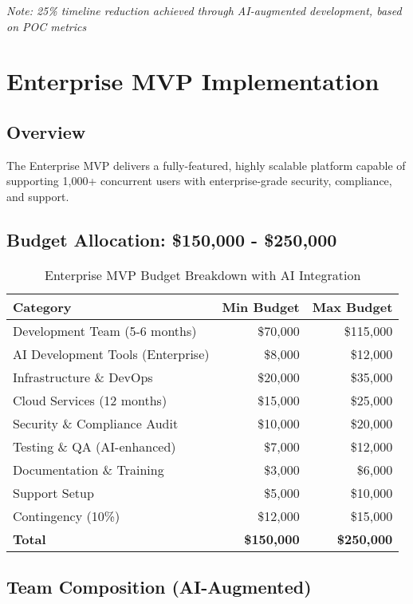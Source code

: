 \documentclass[12pt,a4paper]{report}
\begin{document}
\textit{Note: 25\% timeline reduction achieved through AI-augmented development, based on POC metrics}

\chapter{Enterprise MVP Implementation}

\section{Overview}

The Enterprise MVP delivers a fully-featured, highly scalable platform capable of supporting 1,000+ concurrent users with enterprise-grade security, compliance, and support.

\section{Budget Allocation: \$150,000 - \$250,000}

\begin{table}[H]
\centering
\begin{tabularx}{\textwidth}{|X|r|r|}
\hline
\textbf{Category} & \textbf{Min Budget} & \textbf{Max Budget} \\
\hline
Development Team (5-6 months) & \$70,000 & \$115,000 \\
AI Development Tools (Enterprise) & \$8,000 & \$12,000 \\
Infrastructure \& DevOps & \$20,000 & \$35,000 \\
Cloud Services (12 months) & \$15,000 & \$25,000 \\
Security \& Compliance Audit & \$10,000 & \$20,000 \\
Testing \& QA (AI-enhanced) & \$7,000 & \$12,000 \\
Documentation \& Training & \$3,000 & \$6,000 \\
Support Setup & \$5,000 & \$10,000 \\
Contingency (10\%) & \$12,000 & \$15,000 \\
\hline
\textbf{Total} & \textbf{\$150,000} & \textbf{\$250,000} \\
\hline
\end{tabularx}
\caption{Enterprise MVP Budget Breakdown with AI Integration}
\end{table}

\section{Team Composition (AI-Augmented)}
\end{document}
